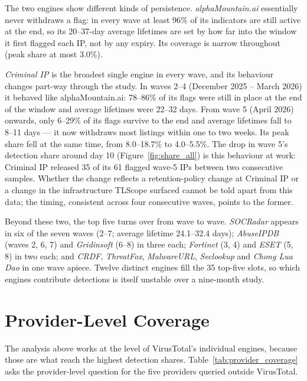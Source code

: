 The two engines show different kinds of persistence. \emph{alphaMountain.ai} essentially never
withdraws a flag: in every wave at least 96\% of its indicators are still active at the end, so its
20--37-day average lifetimes are set by how far into the window it first flagged each IP, not by any
expiry. Its coverage is narrow throughout (peak share at most 3.0\%).

\emph{Criminal IP} is the broadest single engine in every wave, and its behaviour changes
part-way through the study. In waves 2--4 (December 2025 -- March 2026) it behaved like
alphaMountain.ai: 78--86\% of its flags were still in place at the end of the window and average
lifetimes were 22--32 days. From wave 5 (April 2026) onwards, only 6--29\% of its flags survive to
the end and average lifetimes fall to 8--11 days --- it now withdraws most listings within one to two
weeks. Its peak share fell at the same time, from 8.0--18.7\% to 4.0--5.5\%. The drop in wave 5's
detection share around day 10 (Figure~\ref{fig:share_all}) is this behaviour at work: Criminal IP
released 35 of its 61 flagged wave-5 IPs between two consecutive samples. Whether the change reflects
a retention-policy change at Criminal IP or a change in the infrastructure TLScope surfaced cannot be
told apart from this data; the timing, consistent across four consecutive waves, points to the
former.

Beyond these two, the top five turns over from wave to wave. \emph{SOCRadar} appears in six of the
seven waves (2--7; average lifetime 24.1--32.4 days); \emph{AbuseIPDB} (waves 2, 6, 7) and
\emph{Gridinsoft} (6--8) in three each; \emph{Fortinet} (3, 4) and \emph{ESET} (5, 8) in two each;
and \emph{CRDF}, \emph{ThreatFox}, \emph{MalwareURL}, \emph{Seclookup} and \emph{Chong Lua Dao} in one
wave apiece. Twelve distinct engines fill the 35 top-five slots, so which engines contribute
detections is itself unstable over a nine-month study.

\section{Provider-Level Coverage}
\label{sec:provider_coverage}

The analysis above works at the level of VirusTotal's individual engines, because those are what
reach the highest detection shares. Table~\ref{tab:provider_coverage} asks the provider-level
question for the five providers queried outside VirusTotal.

